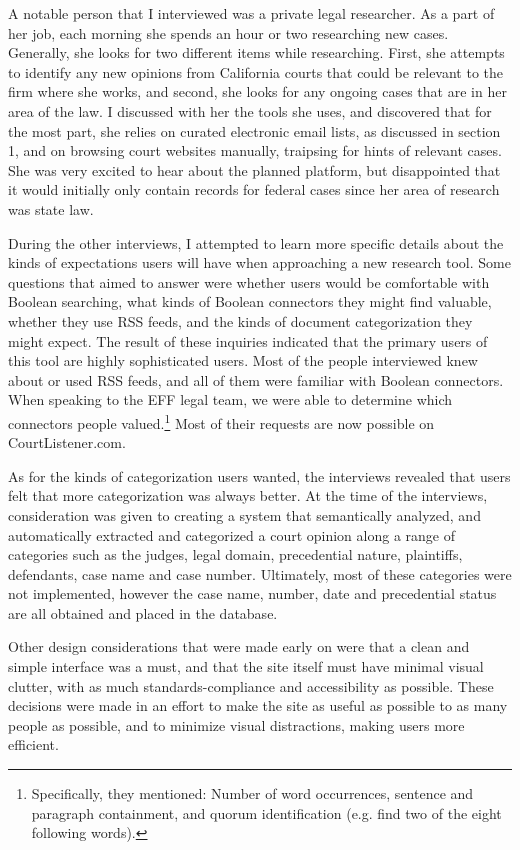 A notable person that I interviewed was a private legal researcher. As a part of her job, each morning she spends an hour or two researching new cases. Generally, she looks for two different items while researching. First, she attempts to identify any new opinions from California courts that could be relevant to the firm where she works, and second, she looks for any ongoing cases that are in her area of the law. I discussed with her the tools she uses, and discovered that for the most part, she relies on curated electronic email lists, as discussed in section 1, and on browsing court websites manually, traipsing for hints of relevant cases. She was very excited to hear about the planned platform, but disappointed that it would initially only contain records for federal cases since her area of research was state law.

During the other interviews, I attempted to learn more specific details about the kinds of expectations users will have when approaching a new research tool. Some questions that aimed to answer were whether users would be comfortable with Boolean searching, what kinds of Boolean connectors they might find valuable, whether they use RSS feeds, and the kinds of document categorization they might expect. The result of these inquiries indicated that the primary users of this tool are highly sophisticated users. Most of the people interviewed knew about or used RSS feeds, and all of them were familiar with Boolean connectors. When speaking to the EFF legal team, we were able to determine which connectors people valued.\footnote{Specifically, they mentioned: Number of word occurrences, sentence and paragraph containment, and quorum identification (e.g. find two of the eight following words).} Most of their requests are now possible on CourtListener.com.

As for the kinds of categorization users wanted, the interviews revealed that users felt that more categorization was always better. At the time of the interviews, consideration was given to creating a system that semantically analyzed, and automatically extracted and categorized a court opinion along a range of categories such as the judges, legal domain, precedential nature, plaintiffs, defendants, case name and case number. Ultimately, most of these categories were not implemented, however the case name, number, date and precedential status are all obtained and placed in the database.

Other design considerations that were made early on were that a clean and simple interface was a must, and that the site itself must have minimal visual clutter, with as much standards-compliance and accessibility as possible. These decisions were made in an effort to make the site as useful as possible to as many people as possible, and to minimize visual distractions, making users more efficient.

